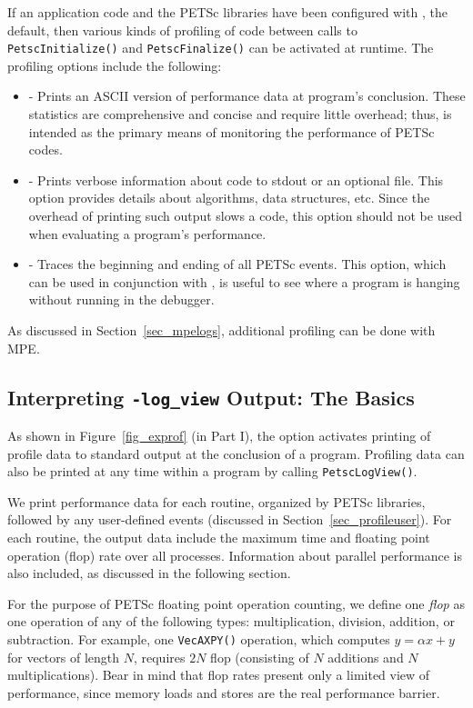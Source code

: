 If an application code and the PETSc libraries have been configured with
, the default,
then various kinds of profiling of code between calls to \lstinline{PetscInitialize()} and \lstinline{PetscFinalize()} can be
activated at runtime.  The profiling options include the following:
 
\begin{itemize}
\item {} - Prints an ASCII version of performance data
     at program's conclusion. These statistics are comprehensive and concise
     and require little overhead; thus,  is intended as
     the primary means of monitoring the performance of PETSc codes.
\item {} - Prints verbose information about code to
     stdout or an optional file. This option provides details about algorithms,
     data structures, etc. Since the overhead of printing such output slows a
     code, this option should not be used when evaluating a program's performance.
\item {} - Traces the beginning and ending of all
     PETSc events.  This option, which can be used in conjunction with
     , is useful to see where a program is hanging
     without running in the debugger.
\end{itemize}
 As discussed in Section~\ref{sec_mpelogs},
additional profiling can be done with MPE.

\subsection{Interpreting {\tt -log\_view} Output: The Basics}
\label{sec_ploginfo}

As shown in Figure~\ref{fig_exprof} (in Part I), the option
  activates printing of profile
data to standard output at the conclusion of a program.  Profiling
data can also be printed at any time within a program by calling \lstinline{PetscLogView()}.

We print performance data for each routine, organized by PETSc
libraries, followed by any user-defined events (discussed in
Section~\ref{sec_profileuser}).  For each routine, the output data
include the maximum time and floating point operation (flop) rate over
all processes.  Information about parallel performance is also
included, as discussed in the following section.

For the purpose of PETSc floating point operation counting, we define
one {\em flop} as one operation of any of the following types:
multiplication, division, addition, or subtraction.  For example, one
\lstinline{VecAXPY()} operation, which computes $y = \alpha x + y$ for
vectors of length $N$, requires $2N$ flop (consisting of $N$
additions and $N$ multiplications).  Bear in mind that flop rates
present only a limited view of performance, since memory loads and stores are
the real performance barrier.

